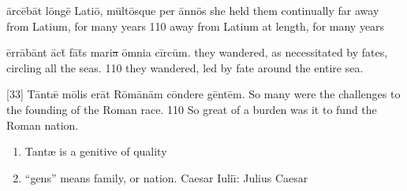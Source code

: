 \newpage

\latline
{\=arc\={\macron e}b\=at l\=ong\={\macron e} L\-at\-i\={\macron o}, m\=ult\={\macron o}squ\-e p\-er \=ann\={\macron o}s}
{she held them continually far away from Latium, for many years }
{110}
{away from Latium at length, for many years}
{}

\latline
{\=err\={\macron a}b\=ant \={\macron a}ct\={\macron{\i}} f\={\macron a}t\={\macron{\i}}s m\-ar\-i\sout{a }\=omn\-i\-a c\=irc\=um.}
{they wandered, as necessitated by fates, circling all the seas.}
{110}
{they wandered, led by fate around the entire sea.}
{}

\latline
{[33] T\=ant\={\ae} m\={\macron o}l\-is \-er\=at R\={\macron o}m\={\macron a}n\=am c\=ond\-er\-e g\=ent\=em.}
{So many were the challenges to the founding of the Roman race.}
{110}
{So great of a burden was it to fund the Roman nation.}
{
\begin{enumerate}
	\item Tant{\ae} is a genitive of quality
	\item ``gens'' means family, or nation.  Caesar Iuli\={\i}:  Julius Caesar
\end{enumerate}
}
